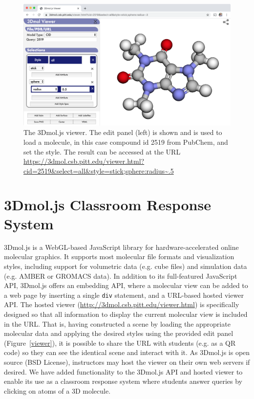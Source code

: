 \documentclass[journal=jceda8,manuscript=article]{achemso}
\begin{document}
\begin{figure}
    \centering
    \includegraphics[width=\linewidth]{viewer}
    \caption{The 3Dmol.js viewer.  The edit panel (left) is shown and is used to load a molecule, in this case compound id 2519 from PubChem, and set the style.  The result can be accessed at the URL \url{https://3dmol.csb.pitt.edu/viewer.html?cid=2519&select=all&style=stick;sphere:radius~.5}}
    \label{fig:viewer}
\end{figure}

\section{3Dmol.js Classroom Response System}

3Dmol.js\cite{rego20153dmol} is a WebGL-based JavaScript library for hardware-accelerated online molecular graphics.  It supports most molecular file formats and visualization styles, including support for volumetric data (e.g. cube files) and simulation data (e.g. AMBER\cite{case2005amber} or GROMACS\cite{van2005gromacs} data).  In addition to its full-featured JavaScript API, 3Dmol.js offers an embedding API, where a molecular view can be added to a web page by inserting a single \texttt{div} statement, and a URL-based hosted viewer API. The hosted viewer (\url{http://3dmol.csb.pitt.edu/viewer.html}) is specifically designed so that all information to display the current molecular view is included in the URL.  That is, having constructed a scene by loading the appropriate molecular data and applying the desired styles using the provided edit panel (Figure~\ref{viewer}), it is possible to share the URL with students (e.g. as a QR code) so they can see the identical scene and interact with it.  As 3Dmol.js is open source (BSD License), instructors may host the viewer on their own web servers if desired.  We have added functionality to the 3Dmol.js API and hosted viewer to enable its use as a classroom response system where students answer queries by clicking on atoms of a 3D molecule.
\end{document}
